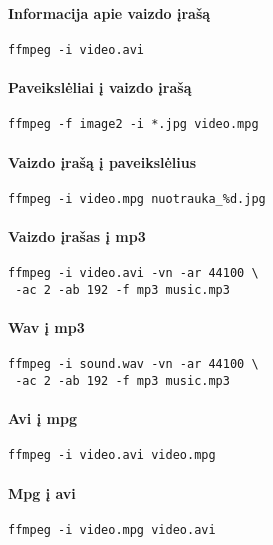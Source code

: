 \documentclass[11pt,a4paper]{article}
\begin{document}
\begin{multicols}{2}

  \paragraph{Informacija apie vaizdo įrašą}
  \begin{verbatim}
ffmpeg -i video.avi
  \end{verbatim}

  \paragraph{Paveikslėliai į vaizdo įrašą}
  \begin{verbatim}
ffmpeg -f image2 -i *.jpg video.mpg
  \end{verbatim}

  \paragraph{Vaizdo įrašą į paveikslėlius}
  \begin{verbatim}
ffmpeg -i video.mpg nuotrauka_%d.jpg
  \end{verbatim}

  \paragraph{Vaizdo įrašas į mp3}
  \begin{verbatim}
ffmpeg -i video.avi -vn -ar 44100 \
 -ac 2 -ab 192 -f mp3 music.mp3
  \end{verbatim}

  \paragraph{Wav į mp3}
  \begin{verbatim}
ffmpeg -i sound.wav -vn -ar 44100 \
 -ac 2 -ab 192 -f mp3 music.mp3
  \end{verbatim}

  \paragraph{Avi į mpg}
  \begin{verbatim}
ffmpeg -i video.avi video.mpg
  \end{verbatim}

  \paragraph{Mpg į avi}
  \begin{verbatim}
ffmpeg -i video.mpg video.avi
  \end{verbatim}


\end{multicols}
\end{document}
